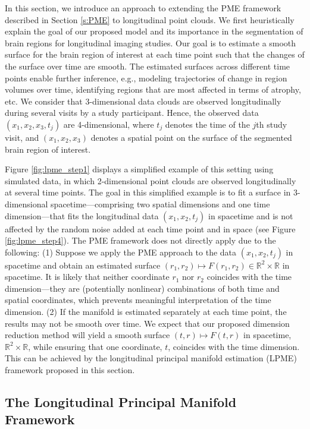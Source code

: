 \documentclass[12pt]{article}
\theoremstyle{definition}
\begin{document}
In this section, we introduce an approach to extending the PME framework described in Section \ref{s:PME} to longitudinal point clouds. We first heuristically explain the goal of our proposed model and its importance in the segmentation of brain regions for longitudinal imaging studies. Our goal is to estimate a smooth surface for the brain region of interest at each time point such that the changes of the surface over time are smooth. The estimated surfaces across different time points enable further inference, e.g., modeling trajectories of change in region volumes over time, identifying regions that are most affected in terms of atrophy, etc. We consider that 3-dimensional data clouds are observed longitudinally during several visits by a study participant. Hence, the observed data $(x_1, x_2, x_3,t_j)$ are 4-dimensional, where $t_j$ denotes the time of the $j$th study visit, and $(x_1, x_2, x_3)$ denotes a spatial point on the surface of the segmented brain region of interest.

Figure \ref{fig:lpme_step1} displays a simplified example of this setting using simulated data, in which 2-dimensional point clouds are observed longitudinally at several time points. The goal in this simplified example is to fit a surface in 3-dimensional spacetime---comprising two spatial dimensions and one time dimension---that fits the longitudinal data $(x_1, x_2, t_j)$ in spacetime and is not affected by the random noise added at each time point and in space (see Figure \ref{fig:lpme_step4}). The PME framework does not directly apply due to the following: (1) Suppose we apply the PME approach to the data $(x_1, x_2, t_j)$ in spacetime and obtain an estimated surface $(r_1, r_2) \mapsto F(r_1, r_2)\in\mathbb{R}^2\times\mathbb{R}$ in spacetime. It is likely that neither coordinate $r_1$ nor $r_2$ coincides with the time dimension---they are (potentially nonlinear) combinations of both time and spatial coordinates, which prevents meaningful interpretation of the time dimension. (2) If the manifold is estimated separately at each time point, the results may not be smooth over time. We expect that our proposed dimension reduction method will yield a smooth surface $(t,r)\mapsto F(t,r)$ in spacetime, $\mathbb{R}^2\times\mathbb{R}$, while ensuring that one coordinate, $t$, coincides with the time dimension. This can be achieved by the longitudinal principal manifold estimation (LPME) framework proposed in this section.

\subsection{The Longitudinal Principal Manifold Framework}\label{section: The Longitudinal Principal Manifold Framework}
\end{document}
